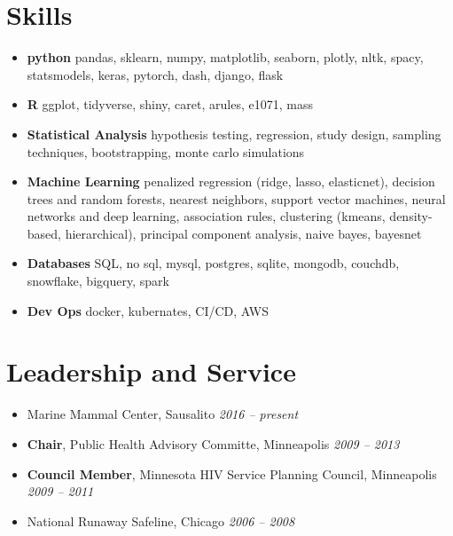 \documentclass[11pt]{article}
\newcommand{\rside}[1]{
  \hfill {\itshape #1}%
}
\begin{document}
\section{Skills}
\begin{itemize}
    \renewcommand{\labelitemi}{}
    \setlength{\leftskip}{-1.5em}
    \item \textbf{python} pandas, sklearn, numpy, matplotlib, seaborn, plotly, nltk, spacy, statsmodels, keras, pytorch, dash, django, flask
    \item \textbf{R} ggplot, tidyverse, shiny, caret, arules, e1071, mass
    \item \textbf{Statistical Analysis} hypothesis testing, regression, study design, sampling techniques, bootstrapping, monte carlo simulations
    \item \textbf{Machine Learning} penalized regression (ridge, lasso, elasticnet), decision trees and random forests, nearest neighbors, support vector machines, neural networks and deep learning, association rules, clustering (kmeans, density-based, hierarchical), principal component analysis, naive bayes, bayesnet
    \item \textbf{Databases} SQL, no sql, mysql, postgres, sqlite, mongodb, couchdb, snowflake, bigquery, spark
    \item \textbf{Dev Ops} docker, kubernates, CI/CD, AWS
\end{itemize}

\section{Leadership and Service}
\begin{itemize}
    \renewcommand{\labelitemi}{}
    \setlength{\leftskip}{-1.5em}
    \item Marine Mammal Center, Sausalito \rside{2016 -- present}
    \item \textbf{Chair}, Public Health Advisory Committe, Minneapolis \rside{2009 -- 2013}
    \item \textbf{Council Member}, Minnesota HIV Service Planning Council, Minneapolis \rside{2009 -- 2011}
    \item National Runaway Safeline, Chicago \rside{2006 -- 2008}
\end{itemize}
\end{document}
